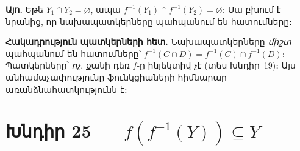 \documentclass[12pt, a4paper]{article}
\begin{document}
\begin{answerbox}
\textbf{Այո.} Եթե $Y_1 \cap Y_2 = \varnothing$, ապա $f^{-1}(Y_1) \cap f^{-1}(Y_2) = \varnothing$։
Սա բխում է նրանից, որ նախապատկերները պահպանում են հատումները։
\end{answerbox}

\bigskip
\textbf{Հակադրություն պատկերների հետ.}\; Նախապատկերները \emph{միշտ} պահպանում են հատումները՝ $f^{-1}(C \cap D) = f^{-1}(C) \cap f^{-1}(D)$։ Պատկերները՝ \emph{ոչ}, քանի դեռ $f$-ը ինյեկտիվ չէ (տես Խնդիր~19)։ Այս անհամաչափությունը ֆունկցիաների հիմնարար առանձնահատկությունն է։

\newpage
\section{Խնդիր 25 — \texorpdfstring{$f(f^{-1}(Y)) \subseteq Y$}{f(f⁻¹(Y)) ⊆ Y}}
\end{document}
